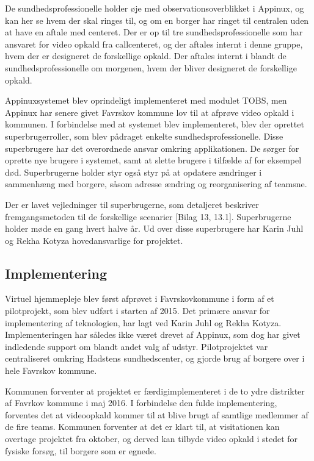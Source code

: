 De sundhedsprofessionelle holder øje med observationsoverblikket i Appinux, og kan her se hvem der skal ringes til, og om en borger har ringet til centralen uden at have en aftale med centeret. Der er op til tre sundhedsprofessionelle som har ansvaret for video opkald fra callcenteret, og der aftales internt i denne gruppe, hvem der er designeret de forskellige opkald.  Der aftales internt i blandt de sundhedsprofessionelle om morgenen, hvem der bliver designeret de forskellige opkald.

Appinuxsystemet blev oprindeligt implementeret med modulet TOBS, men Appinux har senere givet Favrskov kommune lov til at afprøve video opkald i kommunen. I forbindelse med at systemet blev implementeret, blev der oprettet superbrugerroller, som blev pådraget enkelte sundhedsprofessionelle. Disse superbrugere har det overordnede ansvar omkring applikationen. De sørger for oprette nye brugere i systemet, samt at slette brugere i tilfælde af for eksempel død. Superbrugerne holder styr også styr på at opdatere ændringer i sammenhæng med borgere, såsom adresse ændring og reorganisering af teamsne.

Der er lavet vejledninger til superbrugerne, som detaljeret beskriver fremgangsmetoden til de forskellige scenarier [Bilag 13, 13.1]. Superbrugerne holder møde en gang hvert halve år. Ud over disse superbrugere har Karin Juhl og Rekha Kotyza hovedansvarlige for projektet. 

\subsection{Implementering}
Virtuel hjemmepleje blev først afprøvet i Favrskovkommune i form af et pilotprojekt, som blev udført i starten af 2015. Det primære ansvar for implementering af teknologien, har lagt ved Karin Juhl og Rekha Kotyza. Implementeringen har således ikke været drevet af Appinux, som dog har givet indledende support om blandt andet valg af udstyr. Pilotprojektet var centraliseret omkring Hadstens sundhedscenter, og gjorde brug af borgere over i hele Favrskov kommune. 

Kommunen forventer at projektet er færdigimplementeret i de to ydre distrikter af Favrkov kommune i maj 2016. I forbindelse den fulde implementering, forventes det at videoopkald kommer til at blive brugt af samtlige medlemmer af de fire teams. Kommunen forventer at det er klart til, at visitationen kan overtage projektet fra oktober, og derved kan tilbyde video opkald i stedet for fysiske forsøg, til borgere som er egnede.

